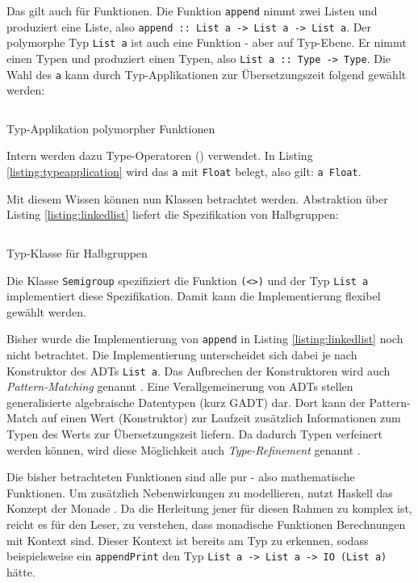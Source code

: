 Das gilt auch für Funktionen.
Die Funktion \texttt{append} nimmt zwei Listen und produziert eine Liste, also \texttt{append :: List a -> List a -> List a}.
Der polymorphe Typ \texttt{List a} ist auch eine Funktion - aber auf Typ-Ebene.
Er nimmt einen Typen und produziert einen Typen, also \texttt{List a :: Type -> Type}.
Die Wahl des \texttt{a} kann durch Typ-Applikationen zur Übersetzungszeit folgend gewählt werden:
\begin{listing}[H]
    \inputminted[linenos=true]{haskell}{Code/Implementierung/Haskell/TypeApplication.hs}
    \caption{Typ-Applikation polymorpher Funktionen}
    \label{listing:typeapplication}
\end{listing}
Intern werden dazu Type-Operatoren (\texttt{\raisebox{-0.6ex}{\textasciitilde}}) verwendet.
In Listing \ref{listing:typeapplication} wird das \texttt{a} mit \texttt{Float} belegt, also gilt: \texttt{a \raisebox{-0.6ex}{\textasciitilde} Float}.

Mit diesem Wissen können nun Klassen betrachtet werden.
Abstraktion über Listing \ref{listing:linkedlist} liefert die Spezifikation von Halbgruppen:
\begin{listing}[H]
    \inputminted[linenos=true]{haskell}{Code/Implementierung/Haskell/Semigroup.hs}
    \caption{Typ-Klasse für Halbgruppen}
    \label{listing:semigroup}
\end{listing}
Die Klasse \texttt{Semigroup} spezifiziert die Funktion \texttt{(<>)} und der Typ \texttt{List a} implementiert diese Spezifikation.
Damit kann die Implementierung flexibel gewählt werden.

Bisher wurde die Implementierung von \texttt{append} in Listing \ref{listing:linkedlist} noch nicht betrachtet.
Die Implementierung unterscheidet sich dabei je nach Konstruktor des ADTs \texttt{List a}.
Das Aufbrechen der Konstruktoren wird auch \textit{Pattern-Matching} genannt \cite{haskell2010report}.
Eine Verallgemeinerung von ADTs stellen generalisierte algebraische Datentypen (kurz GADT) dar.
Dort kann der Pattern-Match auf einen Wert (Konstruktor) zur Laufzeit zusätzlich Informationen zum Typen des Werts zur Übersetzungszeit liefern.
Da dadurch Typen verfeinert werden können, wird diese Möglichkeit auch \textit{Type-Refinement} genannt \cite{gadts}.

Die bisher betrachteten Funktionen sind alle pur - also mathematische Funktionen.
Um zusätzlich Nebenwirkungen zu modellieren, nutzt Haskell das Konzept der Monade \cite{haskell2010report}.
Da die Herleitung jener für diesen Rahmen zu komplex ist, reicht es für den Leser, zu verstehen, dass
monadische Funktionen Berechnungen mit Kontext sind.
Dieser Kontext ist bereits am Typ zu erkennen, sodass beispielsweise ein \texttt{appendPrint} den Typ \texttt{List a -> List a -> IO (List a)} hätte.


